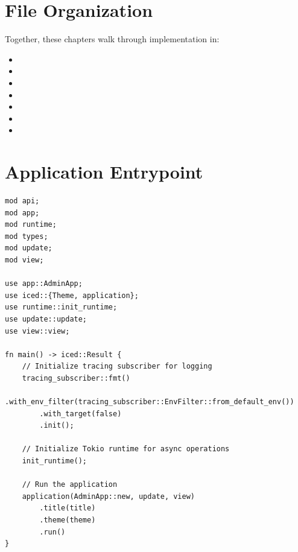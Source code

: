 \section{File Organization}
\label{sec:ch16-files}

Together, these chapters walk through implementation in:

\begin{itemize}
  \item {}
  \item {}
  \item {}
  \item {}
  \item {}
  \item {}
  \item {}
\end{itemize}

\section{Application Entrypoint}
\label{sec:ch16-main}

\begin{listing}[H]
\caption{App entrypoint ()}
\label{lst:ch16-main}
\begin{verbatim}
mod api;
mod app;
mod runtime;
mod types;
mod update;
mod view;

use app::AdminApp;
use iced::{Theme, application};
use runtime::init_runtime;
use update::update;
use view::view;

fn main() -> iced::Result {
    // Initialize tracing subscriber for logging
    tracing_subscriber::fmt()
        .with_env_filter(tracing_subscriber::EnvFilter::from_default_env())
        .with_target(false)
        .init();

    // Initialize Tokio runtime for async operations
    init_runtime();

    // Run the application
    application(AdminApp::new, update, view)
        .title(title)
        .theme(theme)
        .run()
}
\end{verbatim}
\end{listing}

